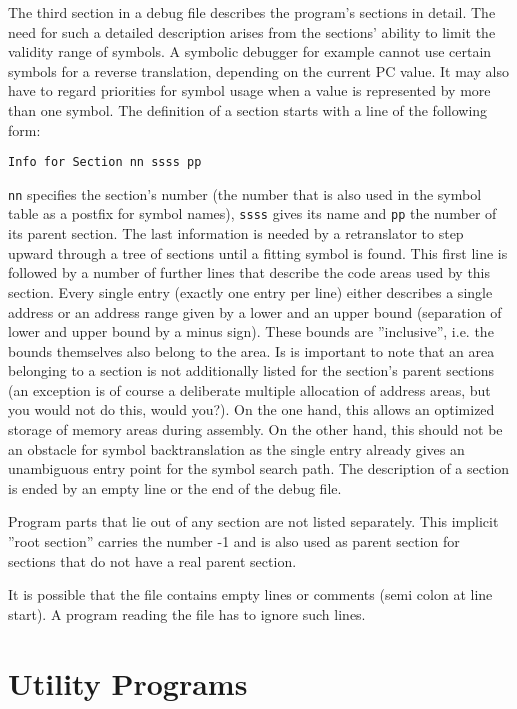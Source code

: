 \documentclass[12pt,twoside]{report}
\newcommand{\tty}[1]{{\tt #1}}
\begin{document}
The third section in a debug file describes the program's sections in
detail.  The need for such a detailed description arises from the
sections' ability to limit the validity range of symbols.  A symbolic
debugger for example cannot use certain symbols for a reverse
translation, depending on the current PC value.  It may also have to
regard priorities for symbol usage when a value is represented by
more than one symbol.  The definition of a section starts with a line
of the following form:
\begin{verbatim}
Info for Section nn ssss pp
\end{verbatim}
\tty{nn} specifies the section's number (the number that is also used in
the symbol table as a postfix for symbol names), \tty{ssss} gives its name
and \tty{pp} the number of its parent section.  The last information is
needed by a retranslator to step upward through a tree of sections
until a fitting symbol is found.  This first line is followed by a
number of further lines that describe the code areas used by this
section.  Every single entry (exactly one entry per line) either
describes a single address or an address range given by a lower and
an upper bound (separation of lower and upper bound by a minus sign). 
These bounds are ''inclusive'', i.e. the bounds themselves also belong
to the area.  Is is important to note that an area belonging to a
section is not additionally listed for the section's parent sections
(an exception is of course a deliberate multiple allocation of address
areas, but you would not do this, would you?).  On the one hand, this
allows an optimized storage of memory areas during assembly. On the
other hand, this should not be an obstacle for symbol backtranslation
as the single entry already gives an unambiguous entry point for the
symbol search path.  The description of a section is ended by an
empty line or the end of the debug file.

Program parts that lie out of any section are not listed separately. 
This implicit ''root section'' carries the number -1 and is also used
as parent section for sections that do not have a real parent
section.

It is possible that the file contains empty lines or comments (semi
colon at line start).  A program reading the file has to ignore such
lines.


\cleardoublepage
\chapter{Utility Programs}
\label{ChapTools}
\end{document}
